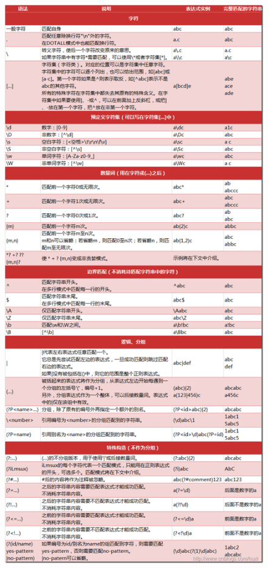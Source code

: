 \documentclass[5pt,a4paper,twocolumn]{article}
\begin{document}
\begin{center}
\begin{figure}[htbp]
\centering
\includegraphics[height=11.5in]{re.jpg}
\end{figure}
\end{center}
\end{document}
